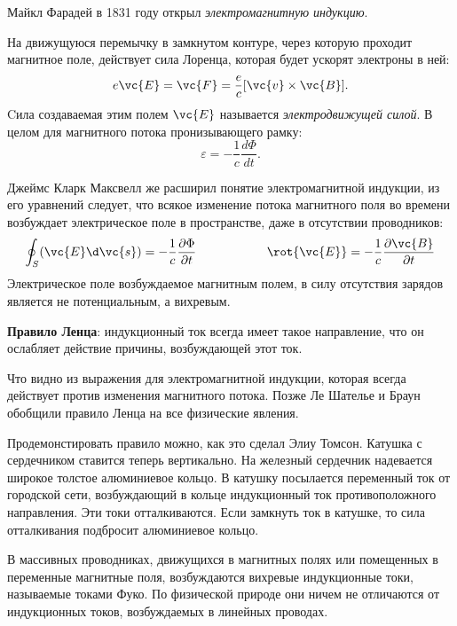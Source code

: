 Майкл Фарадей в 1831 году открыл \textit{электромагнитную индукцию}.

На движущуюся перемычку в замкнутом контуре, через которую проходит магнитное поле, действует сила Лоренца, которая будет ускорят электроны в ней:
\begin{equation}
	e\vc{E} = \vc{F} = \frac{e}{c}[\vc{v} \times \vc{B}].
\end{equation}
Cила создаваемая этим полем $\vc{E}$ называется \textit{электродвижущей силой}. В целом для магнитного потока пронизывающего рамку:
\begin{equation}
	\varepsilon = -\frac{1}{c}\frac{d \Phi}{d t}.
\end{equation}

Джеймс Кларк Максвелл же расширил понятие электромагнитной индукции, из его уравнений следует, что всякое изменение потока магнитного поля во времени возбуждает электрическое поле в пространстве, даже в отсутствии проводников:
\begin{equation}
	\oint_{S}(\vc{E} \d \vc{s}) = -\frac{1}{c} \frac{\partial \Phi}{\partial t} \hspace*{2 cm} \rot{\vc{E}} = -\frac{1}{c} \frac{\partial \vc{B}}{\partial t}
\end{equation}
Электрическое поле возбуждаемое магнитным полем, в силу отсутствия зарядов является не потенциальным, а вихревым.

\textbf{Правило Ленца}: индукционный ток всегда имеет такое направление, что он ослабляет действие причины, возбуждающей этот ток.

Что видно из выражения для электромагнитной индукции, которая всегда действует против изменения магнитного потока. Позже Ле Шателье и Браун обобщили правило Ленца на все физические явления.

Продемонстировать правило можно, как это сделал Элиу Томсон. Катушка с сердечником ставится теперь вертикально. На железный сердечник надевается широкое толстое алюминиевое кольцо. 
В катушку посылается переменный ток от городской сети, возбуждающий в кольце индукционный ток противоположного направления. Эти токи отталкиваются. Если замкнуть ток в катушке, то сила отталкивания подбросит алюминиевое кольцо.

В массивных проводниках, движущихся в магнитных полях или помещенных в переменные магнитные поля, возбуждаются вихревые индукционные токи, называемые токами Фуко. 
По физической природе они ничем не отличаются от индукционных токов, возбуждаемых в линейных проводах. 